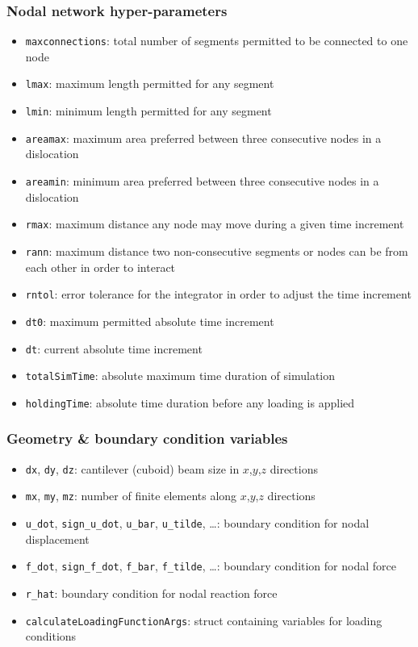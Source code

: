 \documentclass[a4paper,12pt]{article}
\begin{document}
\subsubsection*{Nodal network hyper-parameters}

\begin{itemize}
  \item \texttt{maxconnections}: total number of segments permitted to be connected to one node
  \item \texttt{lmax}: maximum length permitted for any segment
  \item \texttt{lmin}: minimum length permitted for any segment
  \item \texttt{areamax}: maximum area preferred between three consecutive nodes in a dislocation
  \item \texttt{areamin}: minimum area preferred between three consecutive nodes in a dislocation
  \item \texttt{rmax}: maximum distance any node may move during a given time increment
  \item \texttt{rann}: maximum distance two non-consecutive segments or nodes can be from each other in order to interact
  \item \texttt{rntol}: error tolerance for the integrator in order to adjust the time increment
  \item \texttt{dt0}: maximum permitted absolute time increment
  \item \texttt{dt}: current absolute time increment
  \item \texttt{totalSimTime}: absolute maximum time duration of simulation
  \item \texttt{holdingTime}: absolute time duration before any loading is applied
\end{itemize}


\subsubsection*{Geometry \& boundary condition variables}

\begin{itemize}
  \item \texttt{dx}, \texttt{dy}, \texttt{dz}: cantilever (cuboid) beam size in $x$,$y$,$z$ directions
  \item \texttt{mx}, \texttt{my}, \texttt{mz}: number of finite elements along $x$,$y$,$z$ directions
  \item \texttt{u\_dot}, \texttt{sign\_u\_dot}, \texttt{u\_bar}, \texttt{u\_tilde}, \ldots: boundary condition for nodal displacement
  \item \texttt{f\_dot}, \texttt{sign\_f\_dot}, \texttt{f\_bar}, \texttt{f\_tilde}, \ldots: boundary condition for nodal force
  \item \texttt{r\_hat}: boundary condition for nodal reaction force
  \item \texttt{calculateLoadingFunctionArgs}: struct containing variables for loading conditions
\end{itemize}
\end{document}
